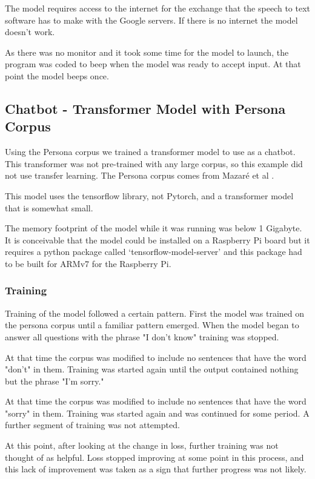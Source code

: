 The model requires access to the internet for the exchange that the speech to text software has to make with the Google servers. If there is no internet the model doesn't work.

As there was no monitor and it took some time for the model to launch, the program was coded to beep when the model was ready to accept input. At that point the model beeps once.

\subsection{Chatbot - Transformer Model with Persona Corpus}
Using the Persona corpus we trained a transformer model to use as a chatbot. This transformer was not pre-trained with any large corpus, so this example did not use transfer learning. The Persona corpus comes from Mazar{\'{e}} et al \cite{DBLP:journals/corr/abs-1809-01984}.

This model uses the tensorflow library, not Pytorch, and a transformer model that is somewhat small.

The memory footprint of the model while it was running was below 1 Gigabyte. It is conceivable that the model could be installed on a Raspberry Pi board but it requires a python package called `tensorflow-model-server' and this package had to be built for ARMv7 for the Raspberry Pi. 

\subsubsection{Training}
Training of the model followed a certain pattern. First the model was trained on the persona corpus until a familiar pattern emerged. When the model began to answer all questions with the 
phrase "I don't know" training was stopped. 

At that time the corpus was modified to include no 
sentences that have the word "don't" in them. Training was started again until the output contained nothing but the phrase "I'm sorry." 

At that time the corpus was modified to include no sentences that have the word "sorry" in them. Training was started again and was continued for some period. A further segment of training was not attempted. 

At this point, after looking at the change in loss, further training was not thought of as helpful. Loss stopped improving at some point in this process, and this lack of improvement was taken as a sign that further progress was not likely.

